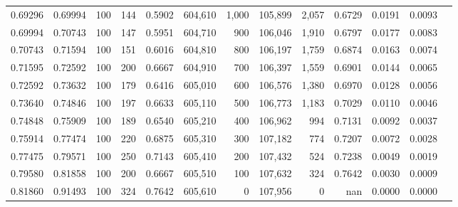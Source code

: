 \begin{tabular}{rrrrrrrrrrrrr}
0.69296 & 0.69994 &   100 & 144 &                                     0.5902 & 604,610 &   1,000 & 105,899 &   2,057 & 0.6729 & 0.0191 & 0.0093 \\
0.69994 & 0.70743 &   100 & 147 &                                     0.5951 & 604,710 &     900 & 106,046 &   1,910 & 0.6797 & 0.0177 & 0.0083 \\
0.70743 & 0.71594 &   100 & 151 &                                     0.6016 & 604,810 &     800 & 106,197 &   1,759 & 0.6874 & 0.0163 & 0.0074 \\
0.71595 & 0.72592 &   100 & 200 &                                     0.6667 & 604,910 &     700 & 106,397 &   1,559 & 0.6901 & 0.0144 & 0.0065 \\
0.72592 & 0.73632 &   100 & 179 &                                     0.6416 & 605,010 &     600 & 106,576 &   1,380 & 0.6970 & 0.0128 & 0.0056 \\
0.73640 & 0.74846 &   100 & 197 &                                     0.6633 & 605,110 &     500 & 106,773 &   1,183 & 0.7029 & 0.0110 & 0.0046 \\
0.74848 & 0.75909 &   100 & 189 &                                     0.6540 & 605,210 &     400 & 106,962 &     994 & 0.7131 & 0.0092 & 0.0037 \\
0.75914 & 0.77474 &   100 & 220 &                                     0.6875 & 605,310 &     300 & 107,182 &     774 & 0.7207 & 0.0072 & 0.0028 \\
0.77475 & 0.79571 &   100 & 250 &                                     0.7143 & 605,410 &     200 & 107,432 &     524 & 0.7238 & 0.0049 & 0.0019 \\
0.79580 & 0.81858 &   100 & 200 &                                     0.6667 & 605,510 &     100 & 107,632 &     324 & 0.7642 & 0.0030 & 0.0009 \\
0.81860 & 0.91493 &   100 & 324 &                                     0.7642 & 605,610 &       0 & 107,956 &       0 &    nan & 0.0000 & 0.0000 \\
\bottomrule
\end{tabular}
